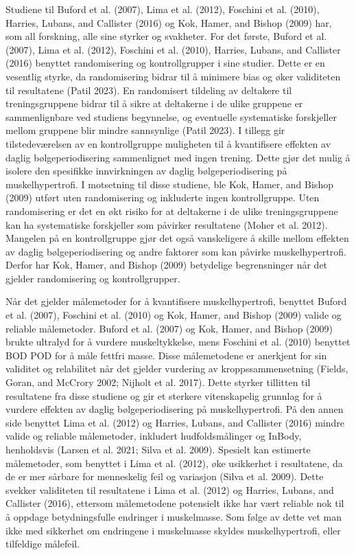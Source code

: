 \documentclass[
  letterpaper,
  DIV=11,
  numbers=noendperiod]{scrreprt}
\begin{document}
Studiene til Buford et al. (2007), Lima et al. (2012), Foschini et al.
(2010), Harries, Lubans, and Callister (2016) og Kok, Hamer, and Bishop
(2009) har, som all forskning, alle sine styrker og svakheter. For det
første, Buford et al. (2007), Lima et al. (2012), Foschini et al.
(2010), Harries, Lubans, and Callister (2016) benyttet randomisering og
kontrollgrupper i sine studier. Dette er en vesentlig styrke, da
randomisering bidrar til å minimere bias og øker validiteten til
resultatene (Patil 2023). En randomisert tildeling av deltakere til
treningsgruppene bidrar til å sikre at deltakerne i de ulike gruppene er
sammenlignbare ved studiens begynnelse, og eventuelle systematiske
forskjeller mellom gruppene blir mindre sannsynlige (Patil 2023). I
tillegg gir tilstedeværelsen av en kontrollgruppe muligheten til å
kvantifisere effekten av daglig bølgeperiodisering sammenlignet med
ingen trening. Dette gjør det mulig å isolere den spesifikke
innvirkningen av daglig bølgeperiodisering på muskelhypertrofi. I
motsetning til disse studiene, ble Kok, Hamer, and Bishop (2009) utført
uten randomisering og inkluderte ingen kontrollgruppe. Uten
randomisering er det en økt risiko for at deltakerne i de ulike
treningsgruppene kan ha systematiske forskjeller som påvirker
resultatene (Moher et al. 2012). Mangelen på en kontrollgruppe gjør det
også vanskeligere å skille mellom effekten av daglig bølgeperiodisering
og andre faktorer som kan påvirke muskelhypertrofi. Derfor har Kok,
Hamer, and Bishop (2009) betydelige begrensninger når det gjelder
randomisering og kontrollgrupper.

Når det gjelder målemetoder for å kvantifisere muskelhypertrofi,
benyttet Buford et al. (2007), Foschini et al. (2010) og Kok, Hamer, and
Bishop (2009) valide og reliable målemetoder. Buford et al. (2007) og
Kok, Hamer, and Bishop (2009) brukte ultralyd for å vurdere
muskeltykkelse, mens Foschini et al. (2010) benyttet BOD POD for å måle
fettfri masse. Disse målemetodene er anerkjent for sin validitet og
relabilitet når det gjelder vurdering av kroppssammensetning (Fields,
Goran, and McCrory 2002; Nijholt et al. 2017). Dette styrker tillitten
til resultatene fra disse studiene og gir et sterkere vitenskapelig
grunnlag for å vurdere effekten av daglig bølgeperiodisering på
muskelhypertrofi. På den annen side benyttet Lima et al. (2012) og
Harries, Lubans, and Callister (2016) mindre valide og reliable
målemetoder, inkludert hudfoldsmålinger og InBody, henholdsvis (Larsen
et al. 2021; Silva et al. 2009). Spesielt kan estimerte målemetoder, som
benyttet i Lima et al. (2012), øke usikkerhet i resultatene, da de er
mer sårbare for menneskelig feil og variasjon (Silva et al. 2009). Dette
svekker validiteten til resultatene i Lima et al. (2012) og Harries,
Lubans, and Callister (2016), ettersom målemetodene potensielt ikke har
vært reliable nok til å oppdage betydningsfulle endringer i muskelmasse.
Som følge av dette vet man ikke med sikkerhet om endringene i
muskelmasse skyldes muskelhypertrofi, eller tilfeldige målefeil.
\end{document}
